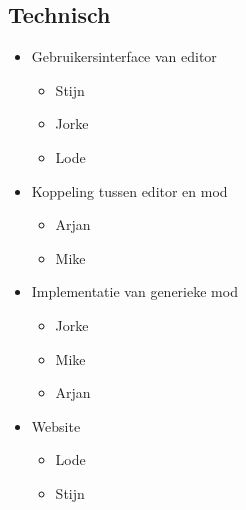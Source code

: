 \documentclass{article}
\begin{document}
	\subsection{Technisch}
	\begin{itemize}
		\item Gebruikersinterface van editor
		\begin{itemize}
			\item Stijn
			\item Jorke
			\item Lode
		\end{itemize}
		\item Koppeling tussen editor en mod
		\begin{itemize}
			\item Arjan
			\item Mike
		\end{itemize}
		\item Implementatie van generieke mod
		\begin{itemize}
			\item Jorke
			\item Mike
			\item Arjan
		\end{itemize}
		\item Website
		\begin{itemize}
			\item Lode
			\item Stijn
		\end{itemize}
	\end{itemize}
\end{document}
